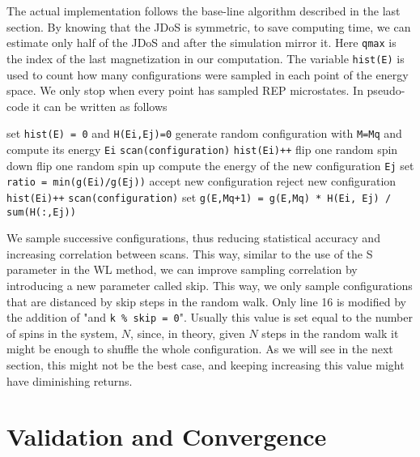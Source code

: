 	The actual implementation follows the base-line algorithm described in the last section. By knowing that the JDoS is symmetric, to save computing time, we can estimate only half of the JDoS and after the simulation mirror it. Here \texttt{qmax} is the index of the last magnetization in our computation. The variable \texttt{hist(E)} is used to count how many configurations were sampled in each point of the energy space. We only stop when every point has sampled REP microstates. In pseudo-code it can be written as follows 
	
\begin{algorithm}
	\begin{algorithmic}[1]
		 	\State set \texttt{hist(E) = 0} and \texttt{H(Ei,Ej)=0}
		 	\State generate random configuration with \texttt{M=Mq} and compute its energy \texttt{Ei}
		 	\State \texttt{scan(configuration)}
		 	\State \texttt{hist(Ei)++}
		 		\State flip one random spin down
		 		\State flip one random spin up
		 		\State compute the energy of the new configuration \texttt{Ej}
		 		\State set \texttt{ratio = min(g(Ei)/g(Ej))}
					\State accept new configuration
				\Else
					\State reject new configuration
		 		\EndIf
		 			\State \texttt{hist(Ei)++}
			 		\State \texttt{scan(configuration)}
		 		\EndIf
		 	\EndWhile
		 	\State set \texttt{g(E,Mq+1) = g(E,Mq) * H(Ei, Ej) / sum(H(:,Ej))} 
		 \EndFor
	\end{algorithmic} 
\end{algorithm}

	We sample successive configurations, thus reducing statistical accuracy and increasing correlation between scans. This way, similar to the use of the S parameter in the WL method, we can improve sampling correlation by introducing a new parameter called skip. This way, we only sample configurations that are distanced by skip steps in the random walk. Only line 16 is modified by the addition of "and \texttt{k \% skip = 0}". Usually this value is set equal to the number of spins in the system, $N$, since, in theory, given $N$ steps in the random walk it might be enough to shuffle the whole configuration. As we will see in the next section, this might not be the best case, and keeping increasing this value might have diminishing returns.
	
\section{Validation and Convergence}

